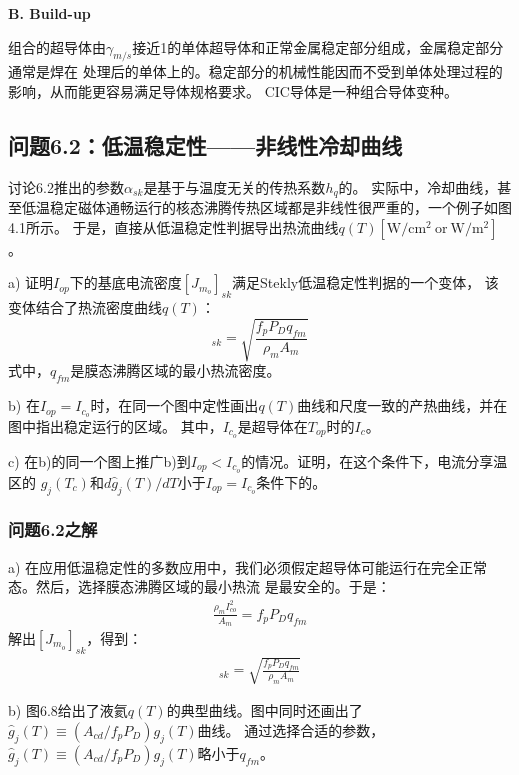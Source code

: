 \textbf{B. Build-up}

组合的超导体由$\gamma_{m/s}$接近1的单体超导体和正常金属稳定部分组成，金属稳定部分通常是焊在
处理后的单体上的。稳定部分的机械性能因而不受到单体处理过程的影响，从而能更容易满足导体规格要求。
CIC导体是一种组合导体变种。

\subsection{问题6.2：低温稳定性——非线性冷却曲线}
讨论6.2推出的参数$\alpha_{sk}$是基于与温度无关的传热系数$h_q$的。
实际中，冷却曲线，甚至低温稳定磁体通畅运行的核态沸腾传热区域都是非线性很严重的，一个例子如图4.1所示。
于是，直接从低温稳定性判据导出热流曲线$q(T)[\mathrm{W/cm^2\ or\ W/m^2}] $。

a) 证明$I_{op}$下的基底电流密度$[J_{m_o}]_{sk}$满足Stekly低温稳定性判据的一个变体，
该变体结合了热流密度曲线$q(T)$：
\begin{equation}%
[J_{m_o}]_{sk}=\sqrt{\frac{f_pP_Dq_{fm}}{\rho_mA_m}}
\end{equation}
式中，$q_{fm}$是膜态沸腾区域的最小热流密度。

b) 在$I_{op}=I_{c_o}$时，在同一个图中定性画出$q(T)$曲线和尺度一致的产热曲线，并在图中指出稳定运行的区域。
其中，$I_{c_o}$是超导体在$T_{op}$时的$I_c$。

c) 在b)的同一个图上推广b)到$I_{op}<I_{c_o}$的情况。证明，在这个条件下，电流分享温区的
$g_j(T_c)$和$d\hat{g}_j(T)/dT$小于$I_{op}=I_{c_o}$条件下的。

\subsubsection{问题6.2之解}
a) 在应用低温稳定性的多数应用中，我们必须假定超导体可能运行在完全正常态。然后，选择膜态沸腾区域的最小热流
是最安全的。于是：
\begin{align*}%
\frac {\rho_mI_{co}^2}{A_m}=f_pP_Dq_{fm} \tag{S2.1}
\end{align*}
解出$[J_{m_o}]_{sk}$，得到：
\begin{align*}%
[J_{m_o}]_{sk}=\sqrt{\frac{f_pP_Dq_{fm}}{\rho_mA_m}} \tag{6.22}
\end{align*}

b) 图6.8给出了液氦$q(T)$的典型曲线。图中同时还画出了$\hat{g}_j(T)\equiv (A_{cd}/f_p P_D)g_j(T)$曲线。
通过选择合适的参数，$\hat{g}_j(T)\equiv (A_{cd}/f_p P_D)g_j(T)$略小于$q_{fm}$。

